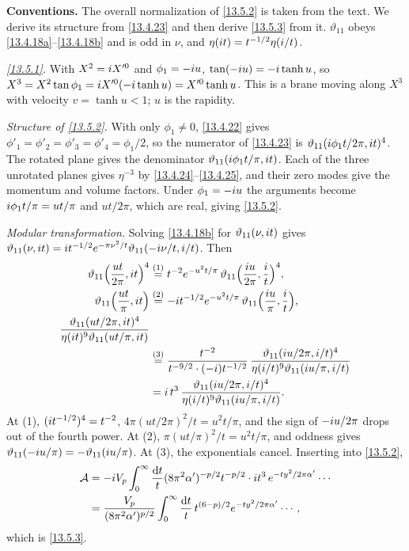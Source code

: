 \begin{tcolorbox}[breakable]
	\begin{remark}
		\textbf{Conventions.} The overall normalization of \eqref{13.5.2} is taken from the text. We derive its structure from \eqref{13.4.23} and then derive \eqref{13.5.3} from it. $\vartheta_{11}$ obeys \eqref{13.4.18a}--\eqref{13.4.18b} and is odd in $\nu$, and $\eta(i t)=t^{-1/2}\eta(i/t)$.

		\textit{\eqref{13.5.1}.} With $X^2=i X'^0$ and $\phi_1=-i u$, $\tan(-i u)=-i\tanh u$, so $X^3=X^2\tan\phi_1=i X'^0(-i\tanh u)=X'^0\tanh u$. This is a brane moving along $X^3$ with velocity $v=\tanh u<1$; $u$ is the rapidity.

		\textit{Structure of \eqref{13.5.2}.} With only $\phi_1\neq0$, \eqref{13.4.22} gives $\phi'_1=\phi'_2=\phi'_3=\phi'_4=\phi_1/2$, so the numerator of \eqref{13.4.23} is $\vartheta_{11}(i\phi_1t/2\pi,i t)^4$. The rotated plane gives the denominator $\vartheta_{11}(i\phi_1t/\pi,i t)$. Each of the three unrotated planes gives $\eta^{-3}$ by \eqref{13.4.24}--\eqref{13.4.25}, and their zero modes give the momentum and volume factors. Under $\phi_1=-i u$ the arguments become $i\phi_1t/\pi=ut/\pi$ and $ut/2\pi$, which are real, giving \eqref{13.5.2}.

		\textit{Modular transformation.} Solving \eqref{13.4.18b} for $\vartheta_{11}(\nu,i t)$ gives $\vartheta_{11}(\nu,i t)=i t^{-1/2}e^{-\pi\nu^2/t}\vartheta_{11}(-i\nu/t,i/t)$. Then
		\begin{align*}
			\vartheta_{11}\Bigl(\frac{ut}{2\pi},i t\Bigr)^4 &\overset{(1)}{=} t^{-2}e^{-u^2t/\pi}\,\vartheta_{11}\Bigl(\frac{i u}{2\pi},\frac{i}{t}\Bigr)^4, \\
			\vartheta_{11}\Bigl(\frac{ut}{\pi},i t\Bigr) &\overset{(2)}{=} -i t^{-1/2}e^{-u^2t/\pi}\,\vartheta_{11}\Bigl(\frac{i u}{\pi},\frac{i}{t}\Bigr),\\
			\frac{\vartheta_{11}(ut/2\pi,i t)^4}{\eta(i t)^9\vartheta_{11}(ut/\pi,i t)} \\ &\overset{(3)}{=} \frac{t^{-2}}{t^{-9/2}\cdot(-i)t^{-1/2}}\,\frac{\vartheta_{11}(i u/2\pi,i/t)^4}{\eta(i/t)^9\vartheta_{11}(i u/\pi,i/t)}\\
			&= i\,t^3\,\frac{\vartheta_{11}(i u/2\pi,i/t)^4}{\eta(i/t)^9\vartheta_{11}(i u/\pi,i/t)} .
		\end{align*}
		At (1), $(i t^{-1/2})^4=t^{-2}$, $4\pi(ut/2\pi)^2/t=u^2t/\pi$, and the sign of $-i u/2\pi$ drops out of the fourth power. At (2), $\pi(ut/\pi)^2/t=u^2t/\pi$, and oddness gives $\vartheta_{11}(-i u/\pi)=-\vartheta_{11}(i u/\pi)$. At (3), the exponentials cancel. Inserting into \eqref{13.5.2},
		\begin{align*}
			\mathcal A &= -i V_p\int_0^\infty\frac{\mathrm{d} t}{t}(8\pi^2\alpha')^{-p/2}t^{-p/2}\cdot i t^3\,e^{-ty^2/2\pi\alpha'}\cdots\\ &= \frac{V_p}{(8\pi^2\alpha')^{p/2}}\int_0^\infty\frac{\mathrm{d} t}{t}\,t^{(6-p)/2}e^{-ty^2/2\pi\alpha'}\cdots ,
		\end{align*}
		which is \eqref{13.5.3}.
	\end{remark}
\end{tcolorbox}

